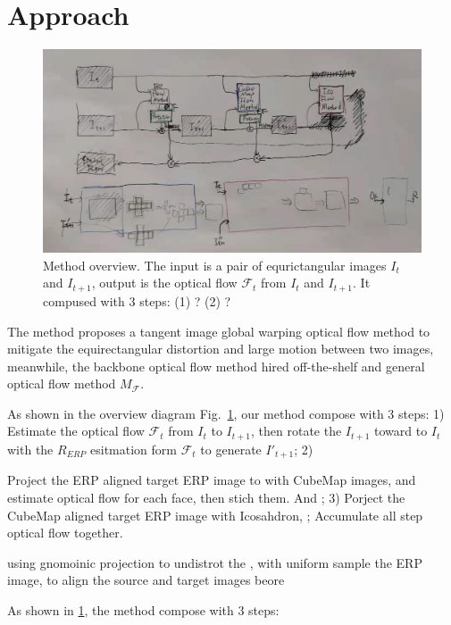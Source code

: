 \section{Approach}\label{sec:approach}

\begin{figure}[hbt!]
	\centering
	\includegraphics[width=0.95\linewidth]{images/method_pipeline_1.jpg}
	\caption{Method overview. The input is a pair of equrictangular images $I_t$ and $I_{t+1}$, output is the optical flow $\mathcal{F}_t$ from  $I_t$ and $I_{t+1}$. It compused with 3 steps: (1) ? (2) ?}
	\label{fig:approach:pipeline}
\end{figure}

The method proposes a tangent image global warping optical flow method to mitigate the equirectangular distortion and large motion between two images, meanwhile, the backbone optical flow method hired off-the-shelf and general optical flow method $M_{\mathcal{F}}$.

As shown in the overview diagram Fig.~\ref{fig:approach:pipeline}, our method compose with 3 steps:
1) Estimate the optical flow $\mathcal{F}_t$ from $I_{t}$ to ${I_{t+1}}$, then rotate the $I_{t+1}$ toward to $I_{t}$ with the $R_{ERP}$ esitmation form $\mathcal{F}_t$ to generate ${I'}_{t+1}$;
2) 

Project the ERP aligned target ERP image to with CubeMap images, and estimate optical flow for each face, then stich them. And ;
3) Porject the CubeMap aligned target ERP image with Icosahdron, ;
 Accumulate all step optical flow together.

 using gnomoinic projection to undistrot the , with uniform sample the ERP image,
 to align the source and target images beore

As shown in \cref{fig:approach:pipeline}, the method compose with 3 steps:

